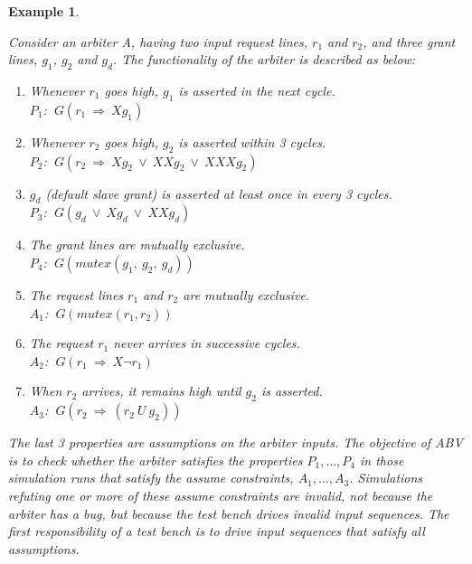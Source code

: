 \documentclass[a4paper, 11pt]{article}
\newtheorem{example}{Example} %
\begin{document}
\begin{example} \label{example1}
{\em
Consider an arbiter A, having two input request lines, $r_1$ and $r_2$,
and three grant lines, $g_1$, $g_2$ and $g_d$. The functionality of
the arbiter is described as below:

\begin{enumerate}
\item Whenever $r_1$ goes high, $g_1$ is asserted in the
        next cycle. \\
	  $P_1$: $\ G(r_1\  \Rightarrow\ Xg_1)$
\item Whenever $r_2$ goes high, $g_2$ is asserted within
        3 cycles. \\
      $P_2$: $\ G(r_2\  \Rightarrow\ Xg_2\ \lor\ XXg_2\ \lor\ XXXg_2)$
\item $g_d$ (default slave grant) is asserted at least once in every 3 cycles.\\
	  $P_3$: $\ G(g_d\  \lor\ Xg_d\ \lor\ XXg_d)$
\item The grant lines are mutually exclusive. \\
	  $P_4$: $\ G(mutex(g_1,\ g_2,\ g_d))$
\item The request lines $r_1$ and $r_2$ are mutually exclusive. \\
	  $A_1$: $\ G(mutex(r_1, r_2))$
\item The request $r_1$ never arrives in successive cycles.\\
	  $A_2$: $\ G(r_1\  \Rightarrow\ X \neg r_1)$
\item When $r_2$ arrives, it remains high until $g_2$ is asserted. \\
	  $A_3$: $\ G(r_2\  \Rightarrow\ (r_2\ U\ g_2))$
\end{enumerate}
The last 3 properties are assumptions on the arbiter inputs.
\noindent
The objective of ABV is to check whether the arbiter satisfies the
properties $P_1, \ldots, P_4$ in those simulation runs that
satisfy the {\em assume constraints}, $A_1, \ldots, A_3$. Simulations
refuting one or more of these assume constraints are invalid,
not because the arbiter has a bug, but because the test bench
drives invalid input sequences. The first responsibility of a test
bench is to drive input sequences that satisfy all assumptions.

}
\end{example}
\end{document}
